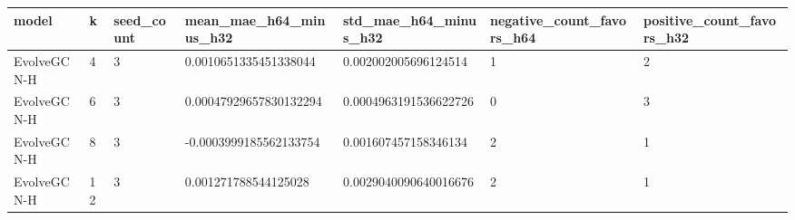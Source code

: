 \begin{tabular}{lllllll}
\hline
model & k & seed\_count & mean\_mae\_h64\_minus\_h32 & std\_mae\_h64\_minus\_h32 & negative\_count\_favors\_h64 & positive\_count\_favors\_h32 \\
\hline
EvolveGCN-H & 4 & 3 & 0.0010651335451338044 & 0.002002005696124514 & 1 & 2 \\
EvolveGCN-H & 6 & 3 & 0.00047929657830132294 & 0.0004963191536622726 & 0 & 3 \\
EvolveGCN-H & 8 & 3 & -0.0003999185562133754 & 0.001607457158346134 & 2 & 1 \\
EvolveGCN-H & 12 & 3 & 0.001271788544125028 & 0.0029040090640016676 & 2 & 1 \\
\hline
\end{tabular}

